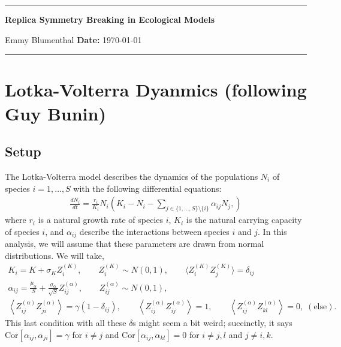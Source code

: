 \documentclass[10pt]{article}
\newcommand{\eval}[1]{\left\langle #1 \right\rangle}
\begin{document}
\begin{center}
	\hrule
	\vspace{.4cm}
	{\textbf { \large Replica Symmetry Breaking in Ecological Models}}
\end{center}
 Emmy Blumenthal \hspace{\fill} \hspace{\fill}  \textbf{} \textbf{Date:} \today\  
\vspace{.4cm}
\hrule

\tableofcontents
\section{Lotka-Volterra Dyanmics (following Guy Bunin)}


\subsection{Setup}

The Lotka-Volterra model describes the dynamics of the populations $N_i$ of species $i = 1,\dots,S$ with the following differential equations:
\begin{align}
	\frac{dN_i}{dt}
	=
	\frac{r_i}{K_i} N_i
	\left(
		K_i - N_i - \sum_{j \in \{1,\dots,S\}\setminus \{i\}}\alpha_{ij} N_j,
	\right) 
\end{align}
where $r_i$ is a natural growth rate of species $i$, $K_i$ is the natural carrying capacity of species $i$, and $\alpha_{ij}$ describe the interactions between species $i$ and $j$.
In this analysis, we will assume that these parameters are drawn from normal distributions.
We will take,
\begin{gather}
	K_i = {K} + \sigma_K Z_{i}^{(K)},
	\qquad Z_{i}^{(K)} \sim N(0,1),
	\qquad \langle Z^{(K)}_i Z^{(K)}_j \rangle = \delta_{ij}
	\\
	\alpha_{ij}
	=
	\frac{\mu_\alpha}{S}
	+
	\frac{\sigma_\alpha}{\sqrt{S}}
	Z^{(\alpha)}_{ij},
	\qquad
	Z_{ij}^{(\alpha)} \sim N(0,1),
	\\
	\eval{Z_{ij}^{(\alpha)}Z_{ji}^{(\alpha)}}
	=
	\gamma(1-\delta_{ij}),
	\qquad
	\eval{Z_{ij}^{(\alpha)}Z_{ij}^{(\alpha)}}
	=
	1,
	\qquad
	\eval{Z_{ij}^{(\alpha)}Z_{kl}^{(\alpha)}}
	=
	0
	,
	\;(\text{else}).
\end{gather}
This last condition with all these $\delta$s might seem a bit weird; succinctly, it says $\mathrm{Cor}[\alpha_{ij},\alpha_{ji}]=\gamma$ for $i \ne j$ and $\mathrm{Cor}[\alpha_{ij},\alpha_{kl}] = 0$ for $i \ne j,l$ and $j \ne i,k$.
\end{document}
